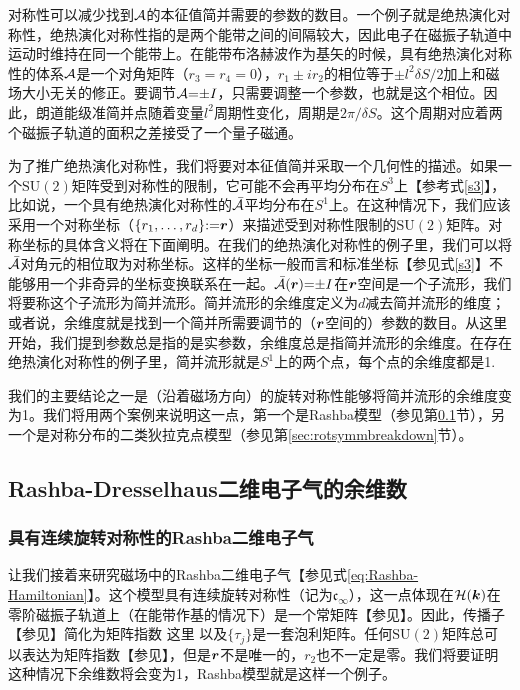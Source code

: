 对称性可以减少找到${\cal A}$的本征值简并需要的参数的数目。一个例子就是绝热演化对称性，绝热演化对称性指的是两个能带之间的间隔较大，因此电子在磁振子轨道中运动时维持在同一个能带上。在能带布洛赫波作为基矢的时候，具有绝热演化对称性的体系${\cal A}$是一个对角矩阵（$r_3{=}r_4{=}0$），$r_1{\pm}ir_2$的相位等于${\pm} l^2\delta S/2$加上和磁场大小无关的修正。要调节${\cal A}{=}{\pm}I$，只需要调整一个参数，也就是这个相位。因此，朗道能级准简并点随着变量$l^2$周期性变化，周期是$2\pi/\delta S$。这个周期对应着两个磁振子轨道的面积之差接受了一个量子磁通。


为了推广绝热演化对称性，我们将要对本征值简并采取一个几何性的描述。如果一个$\text{SU}(2)$矩阵受到对称性的限制，它可能不会再平均分布在$S^3$上【参考式\ref{s3}】，比如说，一个具有绝热演化对称性的${\cal \bar{A}}$平均分布在$S^1$上。在这种情况下，我们应该采用一个对称坐标（$\{r_1,\ldots,r_{d}\}{:}{=}\boldsymbol{r}$）来描述受到对称性限制的$\text{SU}(2)$矩阵。对称坐标的具体含义将在下面阐明。在我们的绝热演化对称性的例子里，我们可以将${\cal \bar{A}}$对角元的相位取为对称坐标。这样的坐标一般而言和标准坐标【参见式\ref{s3}】不能够用一个非奇异的坐标变换联系在一起。${\cal \bar{A}}(\boldsymbol{r}){=}{\pm}I$在$\boldsymbol{r}$空间是一个子流形，我们将要称这个子流形为简并流形。简并流形的余维度定义为$d$减去简并流形的维度；或者说，余维度就是找到一个简并所需要调节的（$\boldsymbol{r}$空间的）参数的数目。从这里开始，我们提到参数总是指的是实参数，余维度总是指简并流形的余维度。在存在绝热演化对称性的例子里，简并流形就是$S^1$上的两个点，每个点的余维度都是1.

我们的主要结论之一是（沿着磁场方向）的旋转对称性能够将简并流形的余维度变为1。我们将用两个案例来说明这一点，第一个是Rashba模型（参见第\ref{sec:singleparameterrashba}节），另一个是对称分布的二类狄拉克点模型（参见第\ref{sec:rotsymmbreakdown}节）。

\subsection{Rashba-Dresselhaus二维电子气的余维数}\label{sec:singleparameterrashba}

\subsubsection{具有连续旋转对称性的Rashba二维电子气}\label{sec:ctsrot}

让我们接着来研究磁场中的Rashba二维电子气【参见式\ref{eq:Rashba-Hamiltonian}】。这个模型具有连续旋转对称性（记为$\mathfrak{c}_{\infty}$），这一点体现在${\cal H}(\boldsymbol{k})$在零阶磁振子轨道上（在能带作基的情况下）是一个常矩阵【参见】。因此，传播子【参见】简化为矩阵指数
这里
以及$\{\tau_j\}$是一套泡利矩阵。任何$\text{SU}(2)$矩阵总可以表达为矩阵指数【参见】，但是$\boldsymbol{r}$不是唯一的，$r_2$也不一定是零。我们将要证明这种情况下余维数将会变为1，Rashba模型就是这样一个例子。



